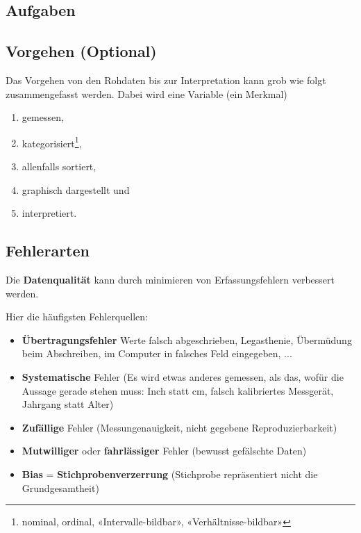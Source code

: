 \subsection*{Aufgaben}

\subsection{Vorgehen (Optional)}
Das Vorgehen von den Rohdaten bis zur Interpretation kann grob wie folgt zusammengefasst werden. Dabei wird eine Variable (ein Merkmal)
\begin{enumerate}
\item gemessen,
\item kategorisiert\footnote{nominal, ordinal, «Intervalle-bildbar»,
    «Verhältnisse-bildbar»},
\item allenfalls sortiert,
\item graphisch dargestellt und
\item interpretiert.
\end{enumerate}
\newpage


\subsection{Fehlerarten}


Die \textbf{Datenqualität} kann durch minimieren
von Erfassungsfehlern verbessert werden.

Hier die häufigsten Fehlerquellen:


\begin{itemize}
  
\item \textbf{Übertragungsfehler} {Werte falsch abgeschrieben, 
  Legasthenie, Übermüdung beim Abschreiben, im Computer in falsches
  Feld eingegeben, ...}

\item \textbf{Systematische} Fehler (Es wird etwas anderes gemessen, als das,
  wofür die Aussage gerade stehen muss: Inch statt cm, falsch
  kalibriertes Messgerät, Jahrgang statt Alter)

\item \textbf{Zufällige} Fehler (Messungenauigkeit, nicht gegebene Reproduzierbarkeit)

\item \textbf{Mutwilliger} oder \textbf{fahrlässiger} Fehler (bewusst
  gefälschte Daten)

\item \textbf{Bias} =
  \textbf{Stichprobenverzerrung}
  (Stichprobe repräsentiert nicht die Grundgesamtheit)
\end{itemize}

